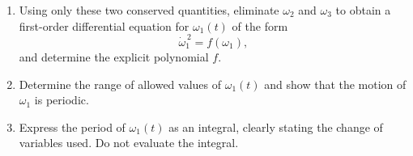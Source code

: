 \documentclass[12pt]{article}
\begin{document}
\begin{enumerate}
\begin{enumerate}
  \item[(b)] Using only these two conserved quantities, eliminate
        \(\omega_2\) and \(\omega_3\) to obtain a first-order differential
        equation for \(\omega_1(t)\) of the form
        \[
        \dot{\omega}_1^{\,2}=f(\omega_1),
        \]
        and determine the explicit polynomial \(f\).

  \item[(c)] Determine the range of allowed values of \(\omega_1(t)\) and show
        that the motion of \(\omega_1\) is periodic.

  \item[(d)] Express the period of \(\omega_1(t)\) as an integral,
        clearly stating the change of variables used. Do not evaluate the
        integral.
\end{enumerate}
\end{enumerate}
\end{document}
